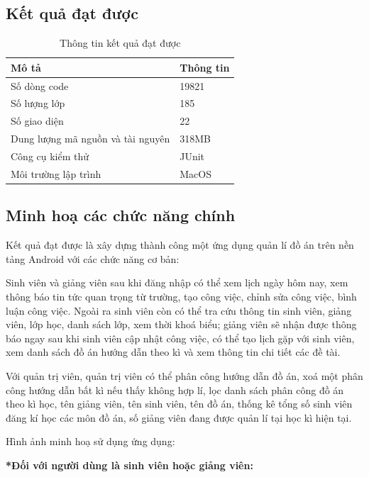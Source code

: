 \documentclass[../Main.tex]{subfiles}
\begin{document}
\subsection{Kết quả đạt được} 
\begin{table}[H]
\centering
\bgroup
\renewcommand{\arraystretch}{1.6}%

\begin{tabular}{|l|l|}
\hline
\textbf{Mô tả} & \textbf{Thông tin} \\ \hline
Số dòng code & 19821 \\ \hline
Số lượng lớp & 185 \\ \hline
Số giao diện & 22 \\ \hline
Dung lượng mã nguồn và tài nguyên & 318MB \\ \hline
Công cụ kiểm thử & JUnit \\ \hline
Môi trường lập trình & MacOS \\ \hline
\end{tabular}

\egroup
\caption{Thông tin kết quả đạt được}
\end{table}
\subsection{Minh hoạ các chức năng chính}
Kết quả đạt được là xây dựng thành công một ứng dụng quản lí đồ án trên nền tảng Android với các chức năng cơ bản:

Sinh viên và giảng viên sau khi đăng nhập có thể xem lịch ngày hôm nay, xem thông báo tin tức quan trọng từ trường, tạo công việc, chỉnh sửa công việc, bình luận công việc. Ngoài ra sinh viên còn có thể tra cứu thông tin sinh viên, giảng viên, lớp học, danh sách lớp, xem thời khoá biểu; giảng viên sẽ nhận được thông báo ngay sau khi sinh viên cập nhật công việc, có thể tạo lịch gặp với sinh viên, xem danh sách đồ án hướng dẫn theo kì và xem thông tin chi tiết các đề tài. 

Với quản trị viên, quản trị viên có thể phân công hướng dẫn đồ án, xoá một phân công hướng dẫn bất kì nếu thấy không hợp lí, lọc danh sách phân công đồ án theo kì học, tên giảng viên, tên sinh viên, tên đồ án, thống kê tổng số sinh viên đăng kí học các môn đồ án, số giảng viên đang được quản lí tại học kì hiện tại. 

Hình ảnh minh hoạ sử dụng ứng dụng:

\textbf{*Đối với người dùng là sinh viên hoặc giảng viên:} \newpage
\end{document}
